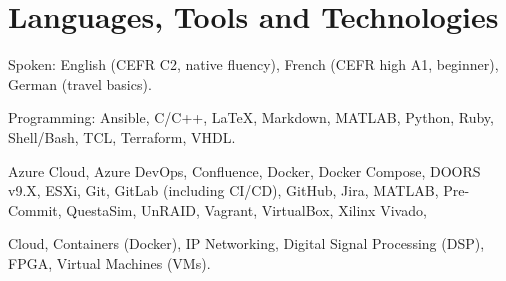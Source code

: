 %
%
\section{Languages, Tools and Technologies}
\descript{ }
Spoken: \hspace{3em} English (CEFR C2, native fluency), French (CEFR high A1, beginner), German (travel basics).

Programming: \hspace{0.5em} Ansible, C/C++, \LaTeX, Markdown, MATLAB, Python, Ruby, Shell/Bash, TCL, Terraform, VHDL.

\sectionsep{}
\descript{ }
Azure Cloud, Azure DevOps, Confluence, Docker, Docker Compose, DOORS v9.X, ESXi, Git, GitLab (including CI/CD), GitHub, Jira, MATLAB, Pre-Commit, QuestaSim, UnRAID, Vagrant, VirtualBox, Xilinx Vivado,

\sectionsep{}
\descript{ }
Cloud, Containers (Docker), IP Networking, Digital Signal Processing (DSP), FPGA, Virtual Machines (VMs).

\sectionsep{}
